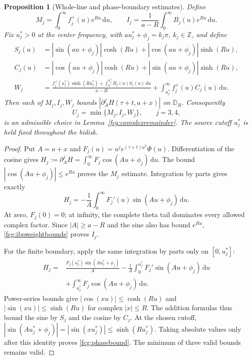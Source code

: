 \documentclass[11pt]{article}
\numberwithin{equation}{section}
\newtheorem{proposition}[theorem]{Proposition}
\newcommand{\dd}{\,\mathrm d}
\begin{document}
\begin{proposition}[Whole-line and phase-boundary estimates]
\label{fcg:ibpenvelope}
Define
\begin{equation}\label{fcg:ibpwhole}
 M_j=\int_0^\infty f_j^+(u)e^{Ru}\dd u,\qquad
 I_j=\frac1{a-R}\int_0^\infty B_j(u)e^{Ru}\dd u.
\end{equation}
Fix $u_j^*>0$ at the center frequency, with
$au_j^*+\phi_j=k_j\pi$, $k_j\in\mathbb Z$, and define
\begin{align}
 S_j(u)&=|\sin(au+\phi_j)|\cosh(Ru)
                  +|\cos(au+\phi_j)|\sinh(Ru),\nonumber\\
 C_j(u)&=|\cos(au+\phi_j)|\cosh(Ru)
                  +|\sin(au+\phi_j)|\sinh(Ru),\label{fcg:phaseweights}\\
 W_j&=\frac{f_j^+(u_j^*)\sinh(Ru_j^*)+
                     \int_0^{u_j^*}B_j(u)S_j(u)\dd u}{a-R}
                 +\int_{u_j^*}^\infty f_j^+(u)C_j(u)\dd u.
 \label{fcg:phasebound}
\end{align}
Then each of $M_j,I_j,W_j$ bounds
$|\partial_A^jH(\tau+t,a+x)|$ on $\mathbb D_R$. Consequently
\begin{equation}\label{fcg:ibpminimum}
 U_j=\min\{M_j,I_j,W_j\},\qquad j=3,4,
\end{equation}
is an admissible choice in Lemma~\ref{fcg:complexremainder}.
The source cutoff $u_j^*$ is held fixed throughout the bidisk.
\end{proposition}
\begin{proof}
Put $A=a+x$ and $F_j(u)=u^j e^{(\tau+t)u^2}\Phi(u)$.
Differentiation of the cosine gives
$H_j:=\partial_A^jH=\int_0^\infty F_j\cos(Au+\phi_j)\dd u$.
The bound $|\cos(Au+\phi_j)|\le e^{Ru}$ proves the $M_j$ estimate.
Integration by parts gives exactly
\begin{equation}\label{fcg:ibpexact}
 H_j=-\frac1A\int_0^\infty F_j'(u)\sin(Au+\phi_j)\dd u.
\end{equation}
At zero, $F_j(0)=0$; at infinity, the complete theta tail dominates
every allowed complex factor. Since $|A|\ge a-R$ and the sine
also has bound $e^{Ru}$, \eqref{fcg:ibpweightbounds} proves $I_j$.

For the finite boundary, apply the same integration by parts only
on $[0,u_j^*]$:
\begin{equation}\label{fcg:ibpfiniteidentity}
 \begin{aligned}
 H_j={}&\frac{F_j(u_j^*)\sin(Au_j^*+\phi_j)}A
 -\frac1A\int_0^{u_j^*}F_j'\sin(Au+\phi_j)\dd u\\
 &+\int_{u_j^*}^\infty F_j\cos(Au+\phi_j)\dd u.
 \end{aligned}
\end{equation}
Power-series bounds give $|\cos(xu)|\le\cosh(Ru)$ and
$|\sin(xu)|\le\sinh(Ru)$ for complex $|x|\le R$.
The addition formulas thus bound the sine by $S_j$ and the cosine
by $C_j$. At the chosen cutoff,
$|\sin(Au_j^*+\phi_j)|=|\sin(xu_j^*)|\le\sinh(Ru_j^*)$.
Taking absolute values only after this identity proves
\eqref{fcg:phasebound}. The minimum of three valid bounds remains valid.
\end{proof}
\end{document}
